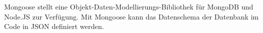 
Mongoose stellt eine Objekt-Daten-Modellierungs-Bibliothek für MongoDB und Node.JS zur Verfügung.
Mit Mongoose kann das Datenschema der Datenbank im Code in JSON definiert werden.

